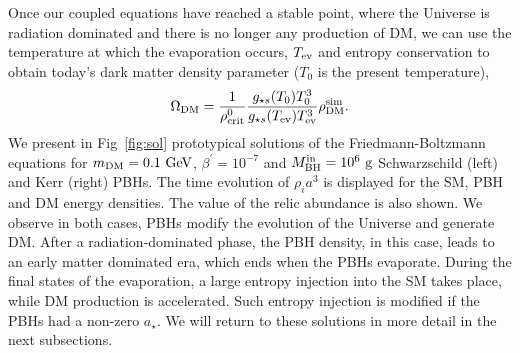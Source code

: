 \documentclass[aps,prd,reprint,twocolumn,preprintnumbers,floatfix,nofootinbib]{revtex4-1}
\newcommand{\mDM}{m_{\rm DM}}
\newcommand{\MBHi}{M_{\rm BH}^{\rm in}}
\newcommand{\as}{a_\star}
\newcommand{\GeV}{\rm GeV}
\newcommand{\g}{\rm g}
\begin{document}
Once our coupled equations have reached a stable point, where the Universe is radiation dominated and there is no longer any production of DM, we can use the temperature at which the evaporation occurs, $T_{\rm ev}$
and entropy conservation to obtain today's dark matter density parameter ($T_0$ is the present temperature),
\begin{equation}
    \Omega_{\rm DM}=  \frac{1}{\rho^0_{\rm crit}}\frac{g_{\star s}(T_0)T_0^3}{g_{\star s}(T_{\rm ev})T_{\rm ev}^3} \rho_{\rm DM}^{\rm sim}.
\end{equation}
We present in Fig~\ref{fig:sol} prototypical solutions of the Friedmann-Boltzmann equations for $\mDM = 0.1~\GeV$, $\beta^\prime = 10^{-7}$ and $\MBHi = 10^6~\g$ Schwarzschild (left) and Kerr (right) PBHs. The time evolution of $\rho_i a^{3}$ is displayed for the SM, PBH and DM energy densities. The value of the relic abundance is also shown. We observe in both cases, PBHs modify the evolution of the Universe and generate DM. After a radiation-dominated phase, the PBH density, in this case, leads to an early matter dominated era, which ends when the PBHs evaporate. During the final states of the evaporation, a large entropy injection into the SM takes place, while DM production is accelerated. Such entropy injection is modified if the PBHs had a non-zero $\as$. We will return to these solutions in more detail in the next subsections.
\end{document}
